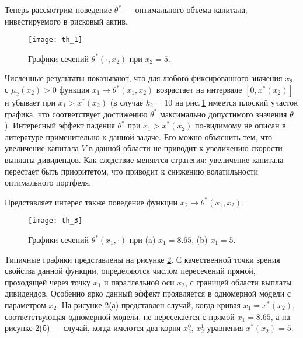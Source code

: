 Теперь рассмотрим поведение $\theta^*$ --- оптимального объема капитала, инвестируемого в рисковый актив.
\begin{figure}[h]
        \centering
          \texttt{[image: th\_1]}
         \caption{Графики сечений $\theta^*(\cdot,x_2)$ при $x_2=5$.}
          \label{fig:1.3}
\end{figure}
Численные результаты показывают, что для любого фиксированного значения $x_2$ с $\mu_2(x_2)>0$ функция $x_1\mapsto \theta^*(x_1,x_2)$ возрастает на интервале $[0,x^*(x_2)]$ и убывает при $x_1>x^*(x_2)$ (в случае $k_2=10$  на рис.\,\ref{fig:1.3} имеется плоский участок графика, что соответствует достижению $\theta^*$ максимально допустимого значения $\overline\theta$). Интересный эффект падения $\theta^*$ при $x_1>x^*(x_2)$ по-видимому не описан в литературе применительно к данной задаче. Его можно объяснить тем, что увеличение капитала $V$ в данной области не приводит к увеличению скорости выплаты дивидендов. Как следствие меняется стратегия: увеличение капитала перестает быть приоритетом, что приводит к снижению волатильности оптимального портфеля.


Представляет интерес также поведение функции $x_2\mapsto\theta^*(x_1,x_2)$.
\begin{figure}[h!]
        \centering
          \texttt{[image: th\_3]}
         \caption{Графики сечений $\theta^*(x_1,\cdot)$ при (a) $x_1=8.65$, (b) $x_1=5$.}
          \label{fig:1.4}
\end{figure}
Типичные графики представлены на рисунке \ref{fig:1.4}. С качественной точки зрения свойства данной функции, определяются числом пересечений прямой, проходящей через точку $x_1$ и параллельной оси $x_2$, с границей области выплаты дивидендов. Особенно ярко данный эффект проявляется в одномерной модели с параметром $x_2$.  На рисунке \ref{fig:1.4}(а) представлен случай, когда кривая $x_1=x^*(x_2)$, соответствующая одномерной модели, не пересекается с прямой $x_1=8.65$, а на рисунке \ref{fig:1.4}(б) --- случай, когда имеются два корня $x_2^0$, $x_2^1$  уравнения $x^*(x_2)=5$.

